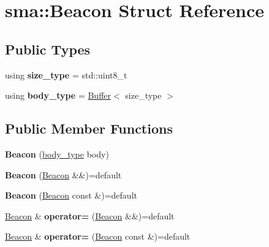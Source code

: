 \hypertarget{structsma_1_1Beacon}{\section{sma\-:\-:Beacon Struct Reference}
\label{structsma_1_1Beacon}
}
\subsection*{Public Types}
\begin{DoxyCompactItemize}
\item 
\hypertarget{structsma_1_1Beacon_a0741055c7878d65e7340f894b82f1a16}{using {\bfseries size\-\_\-type} = std\-::uint8\-\_\-t}\label{structsma_1_1Beacon_a0741055c7878d65e7340f894b82f1a16}

\item 
\hypertarget{structsma_1_1Beacon_a628b27b3ae761f374e32000410b5f390}{using {\bfseries body\-\_\-type} = \hyperlink{structsma_1_1Buffer}{Buffer}$<$ size\-\_\-type $>$}\label{structsma_1_1Beacon_a628b27b3ae761f374e32000410b5f390}

\end{DoxyCompactItemize}
\subsection*{Public Member Functions}
\begin{DoxyCompactItemize}
\item 
\hypertarget{structsma_1_1Beacon_a987e5a3aafe40aaccdc1b9b08df7efed}{{\bfseries Beacon} (\hyperlink{structsma_1_1Buffer}{body\-\_\-type} body)}\label{structsma_1_1Beacon_a987e5a3aafe40aaccdc1b9b08df7efed}

\item 
\hypertarget{structsma_1_1Beacon_a7c2f34666a86f7980ca9d433a7b10831}{{\bfseries Beacon} (\hyperlink{structsma_1_1Beacon}{Beacon} \&\&)=default}\label{structsma_1_1Beacon_a7c2f34666a86f7980ca9d433a7b10831}

\item 
\hypertarget{structsma_1_1Beacon_ad3b2e73ab9333644c75725065bd79aa9}{{\bfseries Beacon} (\hyperlink{structsma_1_1Beacon}{Beacon} const \&)=default}\label{structsma_1_1Beacon_ad3b2e73ab9333644c75725065bd79aa9}

\item 
\hypertarget{structsma_1_1Beacon_a74dc09ac64bccacaa975274b956326db}{\hyperlink{structsma_1_1Beacon}{Beacon} \& {\bfseries operator=} (\hyperlink{structsma_1_1Beacon}{Beacon} \&\&)=default}\label{structsma_1_1Beacon_a74dc09ac64bccacaa975274b956326db}

\item 
\hypertarget{structsma_1_1Beacon_abba9dcdeffb2c0c24441d9a32aa2d51a}{\hyperlink{structsma_1_1Beacon}{Beacon} \& {\bfseries operator=} (\hyperlink{structsma_1_1Beacon}{Beacon} const \&)=default}\label{structsma_1_1Beacon_abba9dcdeffb2c0c24441d9a32aa2d51a}

\end{DoxyCompactItemize}
